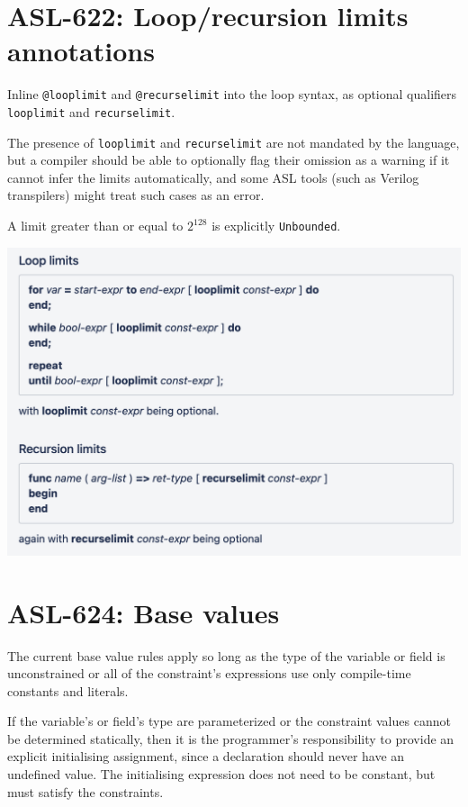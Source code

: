 \section{ASL-622: Loop/recursion limits annotations}

Inline \texttt{@looplimit} and \texttt{@recurselimit} into the loop syntax, as
optional qualifiers \texttt{looplimit} and \texttt{recurselimit}.

The presence of \texttt{looplimit} and \texttt{recurselimit} are not mandated
by the language, but a compiler should be able to optionally flag their
omission as a warning if it cannot infer the limits automatically, and some ASL
tools (such as Verilog transpilers) might treat such cases as an error.

A limit greater than or equal to $2^{128}$ is explicitly \texttt{Unbounded}.


\includegraphics[width=\textwidth]{looprecurselimit.png}

\section{ASL-624: Base values}

The current base value rules apply so long as the type of the variable or
field is unconstrained or all of the constraint's expressions use only
compile-time constants and literals.

If the variable's or field's type are parameterized or the constraint
values cannot be determined statically, then it is the programmer's
responsibility to provide an explicit initialising assignment, since a
declaration should never have an undefined value. The initialising
expression does not need to be constant, but must satisfy the
constraints.

